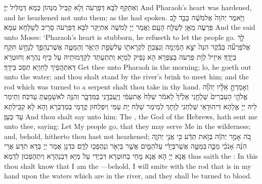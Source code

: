 {וְאִתַּקַּף לִבָּא דְּפַרְעֹה וְלָא קַבֵּיל מִנְּהוֹן כְּמָא דְּמַלֵּיל יְיָ׃}
{And Pharaoh’s heart was hardened, and he hearkened not unto them; as the \lord\space had spoken.}{}
{וַיֹּ֤אמֶר יְהֹוָה֙ אֶל\maqqaf מֹשֶׁ֔ה כָּבֵ֖ד לֵ֣ב פַּרְעֹ֑ה מֵאֵ֖ן לְשַׁלַּ֥ח הָעָֽם׃}
{וַאֲמַר יְיָ לְמֹשֶׁה אִתְיַקַּר לִבָּא דְּפַרְעֹה סָרֵיב לְשַׁלָּחָא עַמָּא׃}
{And the \lord\space said unto Moses: ‘Pharaoh’s heart is stubborn, he refuseth to let the people go.}{}
{לֵ֣ךְ אֶל\maqqaf פַּרְעֹ֞ה בַּבֹּ֗קֶר הִנֵּה֙ יֹצֵ֣א הַמַּ֔יְמָה וְנִצַּבְתָּ֥ לִקְרָאת֖וֹ עַל\maqqaf שְׂפַ֣ת הַיְאֹ֑ר וְהַמַּטֶּ֛ה אֲשֶׁר\maqqaf נֶהְפַּ֥ךְ לְנָחָ֖שׁ תִּקַּ֥ח בְּיָדֶֽךָ׃}
{אִיזֵיל לְוָת פַּרְעֹה בְּצַפְרָא הָא נָפֵיק לְמַיָּא וְתִתְעַתַּד לְקַדָּמוּתֵיהּ עַל כֵּיף נַהְרָא וְחוּטְרָא דְּאִתְהֲפֵיךְ לְחִוְיָא תִּסַּב בִּידָךְ׃}
{Get thee unto Pharaoh in the morning; lo, he goeth out unto the water; and thou shalt stand by the river’s brink to meet him; and the rod which was turned to a serpent shalt thou take in thy hand.}{}
{וְאָמַרְתָּ֣ אֵלָ֗יו יְהֹוָ֞ה אֱלֹהֵ֤י הָעִבְרִים֙ שְׁלָחַ֤נִי אֵלֶ֙יךָ֙ לֵאמֹ֔ר שַׁלַּח֙ אֶת\maqqaf עַמִּ֔י וְיַֽעַבְדֻ֖נִי בַּמִּדְבָּ֑ר וְהִנֵּ֥ה לֹא\maqqaf שָׁמַ֖עְתָּ עַד\maqqaf כֹּֽה׃}
{וְתֵימַר לֵיהּ יְיָ אֱלָהָא דִּיהוּדָאֵי שַׁלְחַנִי לְוָתָךְ לְמֵימַר שַׁלַּח יָת עַמִּי וְיִפְלְחוּן קֳדָמַי בְּמַדְבְּרָא וְהָא לָא קַבֵּילְתָּא עַד כְּעַן׃}
{And thou shalt say unto him: The \lord, the God of the Hebrews, hath sent me unto thee, saying: Let My people go, that they may serve Me in the wilderness; and, behold, hitherto thou hast not hearkened;}{}
{כֹּ֚ה אָמַ֣ר יְהֹוָ֔ה בְּזֹ֣את תֵּדַ֔ע כִּ֖י אֲנִ֣י יְהֹוָ֑ה הִנֵּ֨ה אָנֹכִ֜י מַכֶּ֣ה \legarmeh  בַּמַּטֶּ֣ה אֲשֶׁר\maqqaf בְּיָדִ֗י עַל\maqqaf הַמַּ֛יִם אֲשֶׁ֥ר בַּיְאֹ֖ר וְנֶהֶפְכ֥וּ לְדָֽם׃}
{כִּדְנָן אֲמַר יְיָ בְּדָא תִדַּע אֲרֵי אֲנָא יְיָ הָא אֲנָא מָחֵי בְחוּטְרָא דִּבְיְדִי עַל מַיָּא דִּבְנַהְרָא וְיִתְהַפְכוּן לִדְמָא׃}
{thus saith the \lord: In this thou shalt know that I am the \lord—behold, I will smite with the rod that is in my hand upon the waters which are in the river, and they shall be turned to blood.}{}
